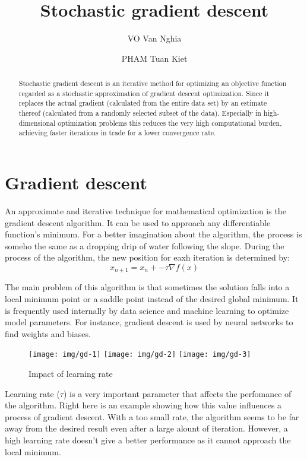 \documentclass[
  a4paper]{article}
\title{Stochastic gradient descent}
\author{VO Van Nghia \and PHAM Tuan Kiet}
\date{}
\begin{document}
\maketitle
\begin{abstract}
Stochastic gradient descent is an iterative method for optimizing an objective function regarded as a stochastic approximation of gradient descent optimization. Since it replaces the actual gradient (calculated from the entire data set) by an estimate thereof (calculated from a randomly selected subset of the data). Especially in high-dimensional optimization problems this reduces the very high computational burden, achieving faster iterations in trade for a lower convergence rate.
\end{abstract}

\hypertarget{gradient-descent}{%
\section{Gradient descent}\label{gradient-descent}}

An approximate and iterative technique for mathematical optimization is the gradient descent algorithm. It can be used to approach any differentiable function's minimum. For a better imagination about the algorithm, the process is someho the same as a dropping drip of water following the slope. During the process of the algorithm, the new position for eaxh iteration is determined by: \[x_{n+1} = x_n + - \tau \nabla f(x)\]

The main problem of this algorithm is that sometimes the solution falls into a local minimum point or a saddle point instead of the desired global minimum. It is frequently used internally by data science and machine learning to optimize model parameters. For instance, gradient descent is used by neural networks to find weights and biases.

\begin{figure}

{\centering \texttt{[image: img/gd-1]} \texttt{[image: img/gd-2]} \texttt{[image: img/gd-3]} 

}

\caption{Impact of learning rate}\label{fig:unnamed-chunk-1}
\end{figure}

Learning rate (\(\tau\)) is a very important parameter that affects the perfomance of the algorithm. Right here is an example showing how this value influences a process of gradient descent. With a too small rate, the algorithm seems to be far away from the desired result even after a large alount of iteration. However, a high learning rate doesn't give a better performance as it cannot approach the local minimum.
\end{document}
